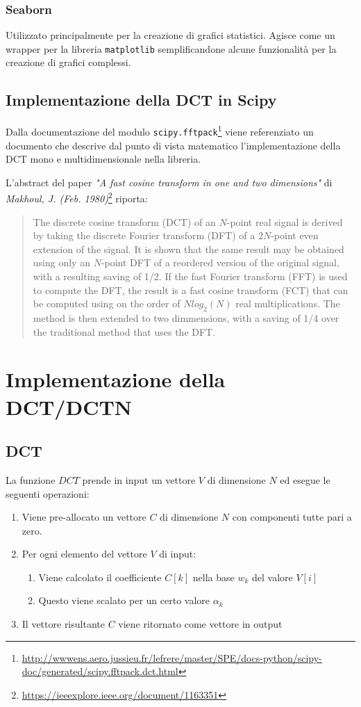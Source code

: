\documentclass[11pt,italian]{article}
\begin{document}
\subsubsection*{Seaborn}
Utilizzato principalmente per la creazione di grafici statistici. Agisce come un wrapper per la libreria \lstinline{matplotlib} semplificandone alcune funzionalità per la creazione di grafici complessi.

\subsection{Implementazione della DCT in Scipy}
\label{section:scipy-fft}
Dalla documentazione del modulo \lstinline{scipy.fftpack}\footnote{\url{http://wwwens.aero.jussieu.fr/lefrere/master/SPE/docs-python/scipy-doc/generated/scipy.fftpack.dct.html}} viene referenziato un documento che descrive dal punto di vista matematico l'implementazione della DCT mono e multidimensionale nella libreria.

\noindent
L'abstract del paper \textit{"A fast cosine transform in one and two dimensions"} di \textit{Makhoul, J. (Feb. 1980)}\footnote{\url{https://ieeexplore.ieee.org/document/1163351}} riporta:
\begin{quote}
    The discrete cosine transform (DCT) of an $N$-point real signal is derived by taking the discrete Fourier transform (DFT) of a $2N$-point even extension of the signal.
    It is shown that the same result may be obtained using only an $N$-point DFT of a reordered version of the original signal, with a resulting saving of 1/2.
    If the fast Fourier transform (FFT) is used to compute the DFT, the result is a fast cosine transform (FCT) that can be computed using on the order of $N log_2(N)$ real multiplications.
    The method is then extended to two dimmensions, with a saving of 1/4 over the traditional method that uses the DFT.
\end{quote}

\newpage
\section{Implementazione della DCT/DCTN}
\subsection{DCT}
La funzione $\mathit{DCT}$ prende in input un vettore $V$ di dimensione $N$ ed esegue le seguenti operazioni:
\begin{enumerate}
    \item Viene pre-allocato un vettore $C$ di dimensione $N$ con componenti tutte pari a zero.
    \item Per ogni elemento del vettore $V$ di input:
    \begin{enumerate}
        \item Viene calcolato il coefficiente $C[k]$ nella base $w_k$ del valore $V[i]$
        \item Questo viene scalato per un certo valore $\alpha_k$
    \end{enumerate}
    \item Il vettore risultante $C$ viene ritornato come vettore in output
\end{enumerate}
\end{document}
